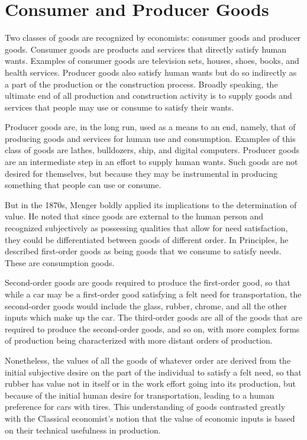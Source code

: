 \section{Consumer and Producer Goods}

Two classes of goods are recognized by economists: consumer goods and producer goods. Consumer goods are products and services that directly satisfy human wants. Examples of consumer goods are television sets, houses, shoes, books, and health services. Producer goods also satisfy human wants but do so indirectly as a part of the production or the construction process. Broadly speaking, the ultimate end of all production and construction activity is to supply goods and services that people may use or consume to satisfy their wants.

Producer goods are, in the long run, used as a means to an end, namely, that of producing goods and services for human use and consumption. Examples of this class of goods are lathes, bulldozers, ship, and digital computers. Producer goods are an intermediate step in an effort to supply human wants. Such goods are not desired for themselves, but because they may be instrumental in producing something that people can use or consume.

But in the 1870s, Menger boldly applied its implications to the determination of value. He noted that since goods are external to the human person and recognized subjectively as possessing qualities that allow for need satisfaction, they could be differentiated between goods of different order. In Principles, he described first-order goods as being goods that we consume to satisfy needs. These are consumption goods.

Second-order goods are goods required to produce the first-order good, so that while a car may be a first-order good satisfying a felt need for transportation, the second-order goods would include the glass, rubber, chrome, and all the other inputs which make up the car. The third-order goods are all of the goods that are required to produce the second-order goods, and so on, with more complex forms of production being characterized with more distant orders of production.

Nonetheless, the values of all the goods of whatever order are derived from the initial subjective desire on the part of the individual to satisfy a felt need, so that rubber has value not in itself or in the work effort going into its production, but because of the initial human desire for transportation, leading to a human preference for cars with tires. This understanding of goods contrasted greatly with the Classical economist’s notion that the value of economic inputs is based on their technical usefulness in production.
    
